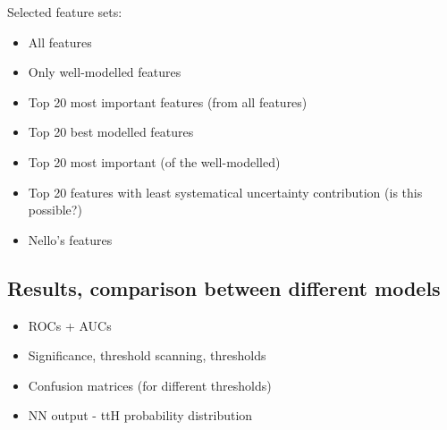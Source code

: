 Selected feature sets:

\begin{itemize}
    \item All features
    \item Only well-modelled features
    \item Top 20 most important features (from all features)
    \item Top 20 best modelled features
    \item Top 20 most important (of the well-modelled)
    \item Top 20 features with least systematical uncertainty contribution (is this possible?)
    \item Nello's features
\end{itemize}



\subsection{Results, comparison between different models}

\begin{itemize}
    \item ROCs + AUCs
    \item Significance, threshold scanning, thresholds
    \item Confusion matrices (for different thresholds)
    \item NN output - ttH probability distribution
\end{itemize}
